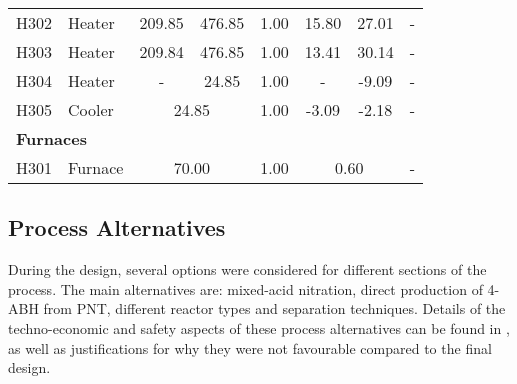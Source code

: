 \begin{table}[H]
\begin{tabular}{cllccccccc}
H302                  & \multicolumn{2}{l}{Heater}                         & 209.85                & 476.85                & 1.00                    & 15.80                & 27.01                & \multicolumn{2}{c}{-}                      \\
H303                  & \multicolumn{2}{l}{Heater}                         & 209.84                & 476.85                & 1.00                    & 13.41                & 30.14                & \multicolumn{2}{c}{-}                      \\
H304                  & \multicolumn{2}{l}{Heater}                         & -                     & 24.85                 & 1.00                    & -                    & -9.09                & \multicolumn{2}{c}{-}                      \\
H305                  & \multicolumn{2}{l}{Cooler}                         & \multicolumn{2}{c}{24.85}                     & 1.00                    & -3.09                & -2.18                & \multicolumn{2}{c}{-}                      \\ \cmidrule{1-10}
\multicolumn{10}{l}{\textbf{Furnaces}}                                                                                                                                                                                                          \\
H301                  & \multicolumn{2}{l}{Furnace}                        & \multicolumn{2}{c}{70.00}                     & 1.00                    & \multicolumn{2}{c}{0.60}                    & \multicolumn{2}{c}{-}                      \\ \bottomrule
\end{tabular}%
\end{table}

\subsection{Process Alternatives}
During the design, several options were considered for different sections of the process. The main alternatives are: mixed-acid  nitration, direct production of 4-ABH from PNT, different reactor types and separation techniques. Details of the techno-economic and safety aspects of these process alternatives can be found in , as well as justifications for why they were not favourable compared to the final design.




